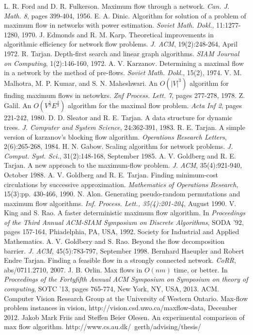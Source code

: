 \documentclass[twocolumn,9pt]{extarticle}
\begin{document}
\begin{thebibliography}{1}
	 L. R. Ford and D. R. Fulkerson. Maximum flow through a network. {\em Can. J. Math. 8}, pages 399-404, 1956.
	 E. A. Dinic. Algorithm for solution of a problem of maximum flow in networks with power estimation. {\em Soviet Math. Dokl.}, 11:1277-1280, 1970.
	 J. Edmonds and R. M. Karp. Theoretical improvements in algorithmic efficiency for network flow problems. {\em J. ACM}, 19(2):248-264, April 1972.
	 R. Tarjan. Depth-first search and linear graph algorithms. {\em SIAM Journal on Computing}, 1(2):146-160, 1972.
	 A. V. Karzanov. Determining a maximal flow in a network by the method of pre-flows. {\em Soviet Math. Dokl.}, 15(2), 1974.
	 V. M. Malhotra, M. P. Kumar, and S. N. Maheshwari. An $O(|V|^3)$ algorithm for finding maximum flows in netowkrs. {\em Znf Process. Lett. 7}, pages 277-278, 1978.
	 Z. Galil. An $O(V^{\frac{5}{3}}E^{\frac{2}{3}})$ algorithm for the maximal flow problem. {\em Acta Inf 2}, pages 221-242, 1980.
	 D. D. Sleator and R. E. Tarjan. A data structure for dynamic trees. {\em J. Computer and System Science}, 24:362-391, 1983.
	 R. E. Tarjan. A simple version of karzanov's blocking flow algorithm. {\em Operations Research Letters}, 2(6):265-268, 1984.
	 H. N. Gabow. Scaling algorithm for network problems. {\em J. Comput. Syst. Sci.}, 31(2):148-168, September 1985.
	 A. V. Goldberg and R. E. Tarjan. A new approach to the maximum-flow problem. {\em J. ACM}, 35(4):921-940, October 1988.
	 A. V. Goldberg and R. E. Tarjan. Finding minimum-cost circulations by successive approximation. {\em Mathematics of Operations Research}, 15(3):pp. 430-466, 1990.
	 N. Alon. Generating pseudo-random permutations and maximum flow algorithms. {\em Inf. Process. Lett., 35(4):201-204}, August 1990.
	 V. King and S. Rao. A faster deterministic maximum flow algorithm. In {\em Proceedings of the Third Annual ACM-SIAM Symposium on Discrete Algorithms}, SODA '92, pages 157-164, Phiadelphia, PA, USA, 1992. Society for Industrial and Applied Mathematics.
	 A. V. Goldbery and S. Rao. Beyond the flow decomposition barrier. {\em J. ACM}, 45(5):783-797, September 1998.
	 Bernhard Haeupler and Robert Endre Tarjan. Finding a feasible flow in a strongly connected network. {\em CoRR}, abs/0711.2710, 2007.
	 J. B. Orlin. Max flows in $O(nm)$ time, or better. In {\em Proceedings of the Fortyfifth Annual ACM Symposium on Symposium on theory of computing}, SOTC '13, pages 765-774, New York, NY, USA, 2013. ACM.
	 Computer Vision Research Group at the University of Western Ontario. Max-flow problem instances in vision, http://vision.csd.uwo.ca/maxflow-data, December 2012.
	 Jakob Mark Friis and Steffen Beier Olesen. An experimental comparison of max flow algorithm. http://www.cs.au.dk/~gerth/advising/thesis/
	


\end{thebibliography}
\end{document}
